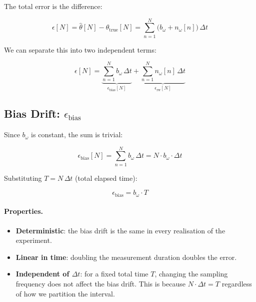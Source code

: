 The total error is the difference:

\begin{equation}
  \epsilon[N] = \hat{\theta}[N] - \theta_\text{true}[N]
              = \sum_{n=1}^{N} \bigl(b_\omega + n_\omega[n]\bigr)\,\Delta t
  \label{eq:app:total_error}
\end{equation}

\noindent We can separate this into two independent terms:

\begin{equation}
  \epsilon[N]
  = \underbrace{\sum_{n=1}^{N} b_\omega\,\Delta t}_{\epsilon_\text{bias}[N]}
  + \underbrace{\sum_{n=1}^{N} n_\omega[n]\,\Delta t}_{\epsilon_\text{rw}[N]}
  \label{eq:app:error_split}
\end{equation}

\subsection{Bias Drift: $\epsilon_\text{bias}$}
\label{app:bias}

Since $b_\omega$ is constant, the sum is trivial:

\begin{equation}
  \epsilon_\text{bias}[N]
  = \sum_{n=1}^{N} b_\omega\,\Delta t
  = N \cdot b_\omega \cdot \Delta t
  \label{eq:app:bias_sum}
\end{equation}

\noindent Substituting $T = N\,\Delta t$ (total elapsed time):

\begin{equation}
  \boxed{\;\epsilon_\text{bias} = b_\omega \cdot T\;}
  \label{eq:app:bias_final}
\end{equation}

\paragraph{Properties.}
\begin{itemize}
  \item \textbf{Deterministic}: the bias drift is the same in every
        realisation of the experiment.
  \item \textbf{Linear in time}: doubling the measurement duration doubles
        the error.
  \item \textbf{Independent of $\Delta t$}: for a fixed total time $T$,
        changing the sampling frequency does not affect the bias drift.
        This is because $N \cdot \Delta t = T$ regardless of how we
        partition the interval.
\end{itemize}

